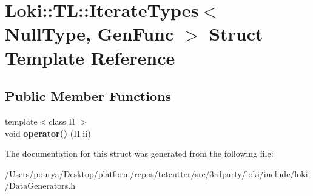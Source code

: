 \hypertarget{structLoki_1_1TL_1_1IterateTypes_3_01NullType_00_01GenFunc_01_4}{}\section{Loki\+:\+:T\+L\+:\+:Iterate\+Types$<$ Null\+Type, Gen\+Func $>$ Struct Template Reference}
\label{structLoki_1_1TL_1_1IterateTypes_3_01NullType_00_01GenFunc_01_4}
\subsection*{Public Member Functions}
\begin{DoxyCompactItemize}
\item 
\hypertarget{structLoki_1_1TL_1_1IterateTypes_3_01NullType_00_01GenFunc_01_4_a27c5f3e7f4609ce1b08de95b64caa85d}{}{\footnotesize template$<$class I\+I $>$ }\\void {\bfseries operator()} (I\+I ii)\label{structLoki_1_1TL_1_1IterateTypes_3_01NullType_00_01GenFunc_01_4_a27c5f3e7f4609ce1b08de95b64caa85d}

\end{DoxyCompactItemize}


The documentation for this struct was generated from the following file\+:\begin{DoxyCompactItemize}
\item 
/\+Users/pourya/\+Desktop/platform/repos/tetcutter/src/3rdparty/loki/include/loki/Data\+Generators.\+h\end{DoxyCompactItemize}
